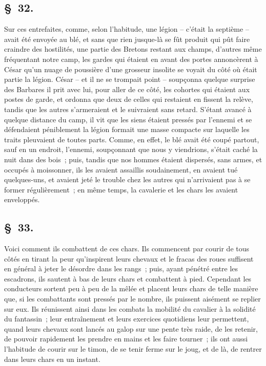 \documentclass[french,twoside]{book} %
\begin{document}
\subsection[{§ 32.}]{ \textsc{§ 32.} }
\noindent Sur ces entrefaites, comme, selon l’habitude, une légion – c’était la septième – avait été envoyée au blé, et sans que rien jusque-là se fût produit qui pût faire craindre des hostilités, une partie des Bretons restant aux champs, d’autres même fréquentant notre camp, les gardes qui étaient en avant des portes annoncèrent à César qu’un nuage de poussière d’une grosseur insolite se voyait du côté où était partie la légion. César – et il ne se trompait point – soupçonna quelque surprise des Barbares il prit avec lui, pour aller de ce côté, les cohortes qui étaient aux postes de garde, et ordonna que deux de celles qui restaient en fissent la relève, tandis que les autres s’armeraient et le suivraient sans retard. S'étant avancé à quelque distance du camp, il vit que les siens étaient pressés par l’ennemi et se défendaient péniblement la légion formait une masse compacte sur laquelle les traits pleuvaient de toutes parts. Comme, en effet, le blé avait été coupé partout, sauf en un endroit, l’ennemi, soupçonnant que nous y viendrions, s’était caché la nuit dans des bois ; puis, tandis que nos hommes étaient dispersés, sans armes, et occupés à moissonner, ils les avaient assaillis soudainement, en avaient tué quelques-uns, et avaient jeté le trouble chez les autres qui n’arrivaient pas à se former régulièrement ; en même temps, la cavalerie et les chars les avaient enveloppés.
\subsection[{§ 33.}]{ \textsc{§ 33.} }
\noindent Voici comment ils combattent de ces chars. Ils commencent par courir de tous côtés en tirant la peur qu’inspirent leurs chevaux et le fracas des roues suffisent en général à jeter le désordre dans les rangs ; puis, ayant pénétré entre les escadrons, ils sautent à bas de leurs chars et combattent à pied. Cependant les conducteurs sortent peu à peu de la mêlée et placent leurs chars de telle manière que, si les combattants sont pressés par le nombre, ils puissent aisément se replier sur eux. Ils réunissent ainsi dans les combats la mobilité du cavalier à la solidité du fantassin ; leur entraînement et leurs exercices quotidiens leur permettent, quand leurs chevaux sont lancés au galop sur une pente très raide, de les retenir, de pouvoir rapidement les prendre en mains et les faire tourner ; ils ont aussi l’habitude de courir sur le timon, de se tenir ferme sur le joug, et de là, de rentrer dans leurs chars en un instant.
\end{document}
